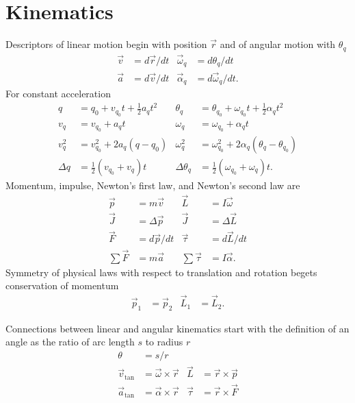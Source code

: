 \section{Kinematics}
Descriptors of linear motion begin with position $\vec{r}$ and of
angular motion with $\theta_q$
\begin{align*}
  \vec{v} &= d\vec{r}/dt  & \vec{\omega}_q &= d\theta_q/dt\\
  \vec{a} &= d\vec{v}/dt  & \vec{\alpha}_q &= d\vec{\omega}_q/dt.
\end{align*}
For constant acceleration
\begin{align*}
q &= q_0 + v_{q_0} t + \tfrac{1}{2}a_q t^2 &\theta_q &= \theta_{q_0} + \omega_{q_0} t + \tfrac{1}{2}\alpha_q t^2\\
v_q &= v_{q_0} + a_q t  & \omega_q &= \omega_{q_0} + \alpha_q t\\
v_q^2 &= v_{q_0}^2 + 2a_q(q-q_0)  &  \omega_q^2 &= \omega_{q_0}^2 + 2\alpha_q(\theta_q-\theta_{q_0})\\
\Delta q &= \tfrac{1}{2}(v_{q_0} + v_q)t  & \Delta \theta_q &= \tfrac{1}{2}(\omega_{q_0} + \omega_q)t.
\end{align*}
Momentum, impulse, Newton's first law, and Newton's second law are 
\begin{align*}
  \vec{p} &= m\vec{v}  & \vec{L} &= I\vec{\omega}\\
  \vec{J} &= \Delta \vec{p}  & \vec{J} &= \Delta \vec{L}\\
  \vec{F} &= d\vec{p}/dt  & \vec{\tau} &= d\vec{L}/dt\\
  \textstyle\sum \vec{F} &= m\vec{a}  & \textstyle\sum \vec{\tau} &= I\vec{\alpha}.
\end{align*}
Symmetry of physical laws with respect to translation and rotation begets
conservation of momentum
\begin{align*}
  \vec{p}_1 &= \vec{p}_2 & \vec{L}_1 &= \vec{L}_2.
\end{align*}

Connections between linear and angular kinematics start with the definition
of an angle as the ratio of arc length $s$ to radius $r$
\begin{align*}
  \theta &= s/r\\
  \vec{v}_{\text{tan}} &= \vec{\omega} \times \vec{r} & \vec{L} &= \vec{r} \times \vec{p}\\
  \vec{a}_{\text{tan}} &= \vec{\alpha} \times \vec{r} & \vec{\tau} &= \vec{r} \times \vec{F}  
\end{align*}

